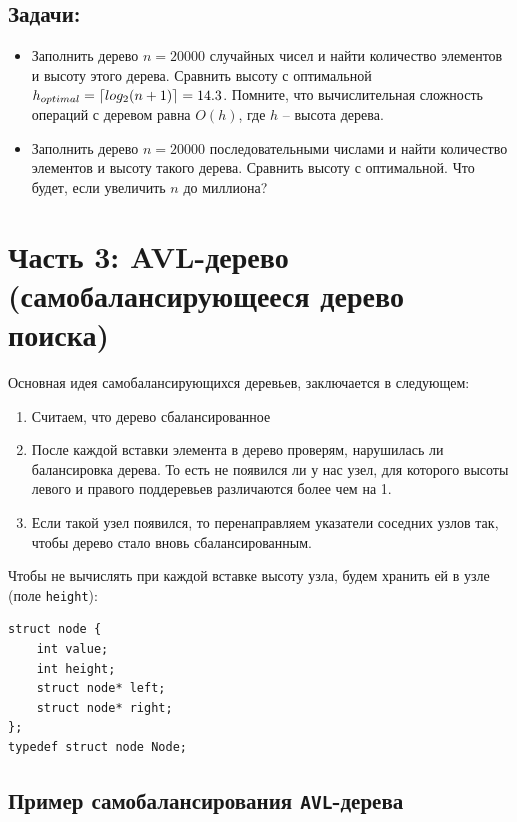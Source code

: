 \documentclass{article}
\DeclarePairedDelimiter\ceil{\lceil}{\rceil}
\begin{document}
\subsection*{Задачи:}
\begin{itemize}
\item Заполнить дерево $n = 20000$ случайных чисел и найти количество элементов и высоту этого дерева. Сравнить высоту с оптимальной $h_{optimal} = \ceil*{log_2(n + 1)} = 14.3$. Помните, что вычислительная сложность операций с деревом равна $O(h)$, где $h$ -- высота дерева.
\item Заполнить дерево  $n = 20000$ последовательными числами и найти количество элементов и высоту такого дерева. Сравнить высоту с оптимальной. Что будет, если увеличить $n$ до миллиона?
\end{itemize}


\section*{Часть 3: AVL-дерево (самобалансирующееся дерево поиска)} 
Основная идея самобалансирующихся деревьев, заключается в следующем:
\begin{enumerate}
\item Считаем, что дерево сбалансированное
\item После каждой вставки элемента в дерево проверям, нарушилась ли балансировка дерева. То есть не появился ли у нас узел, для которого высоты левого и правого поддеревьев различаются более чем на 1.
\item Если такой узел появился, то перенаправляем указатели соседних узлов так, чтобы дерево стало вновь сбалансированным.
\end{enumerate}

Чтобы не вычислять при каждой вставке высоту узла, будем хранить ей в узле (поле \texttt{height}):
\begin{lstlisting}
struct node {
    int value;
    int height;
    struct node* left;
    struct node* right;
};
typedef struct node Node;
\end{lstlisting}

\newpage
\subsection*{Пример самобалансирования \texttt{AVL}-дерева}
\end{document}
